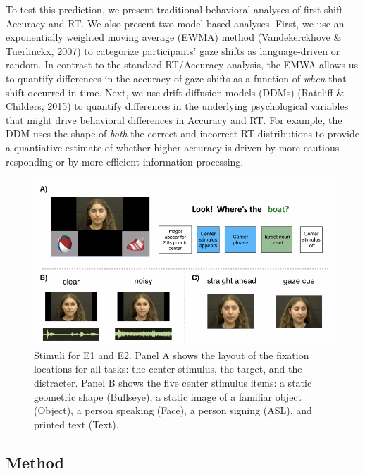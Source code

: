 \documentclass[10pt, letterpaper]{article}
\newenvironment{CodeChunk}{}{}
\begin{document}
To test this prediction, we present traditional behavioral analyses of
first shift Accuracy and RT. We also present two model-based analyses.
First, we use an exponentially weighted moving average (EWMA) method
(Vandekerckhove \& Tuerlinckx, 2007) to categorize participants' gaze
shifts as language-driven or random. In contrast to the standard
RT/Accuracy analysis, the EMWA allows us to quantify differences in the
accuracy of gaze shifts as a function of \emph{when} that shift occurred
in time. Next, we use drift-diffusion models (DDMs) (Ratcliff \&
Childers, 2015) to quantify differences in the underlying psychological
variables that might drive behavioral differences in Accuracy and RT.
For example, the DDM uses the shape of \emph{both} the correct and
incorrect RT distributions to provide a quantiative estimate of whether
higher accuracy is driven by more cautious responding or by more
efficient information processing.

\begin{CodeChunk}
\begin{figure}[h]

{\centering \includegraphics{figs/stimuli-1} 

}

\caption[Stimuli for E1 and E2]{Stimuli for E1 and E2. Panel A shows the layout of the fixation locations for all tasks: the center stimulus, the target, and the distracter. Panel B shows the five center stimulus items: a static geometric shape (Bullseye), a static image of a familiar object (Object), a person speaking (Face), a person signing (ASL), and printed text (Text).}\label{fig:stimuli}
\end{figure}
\end{CodeChunk}

\subsection{Method}\label{method}
\end{document}
